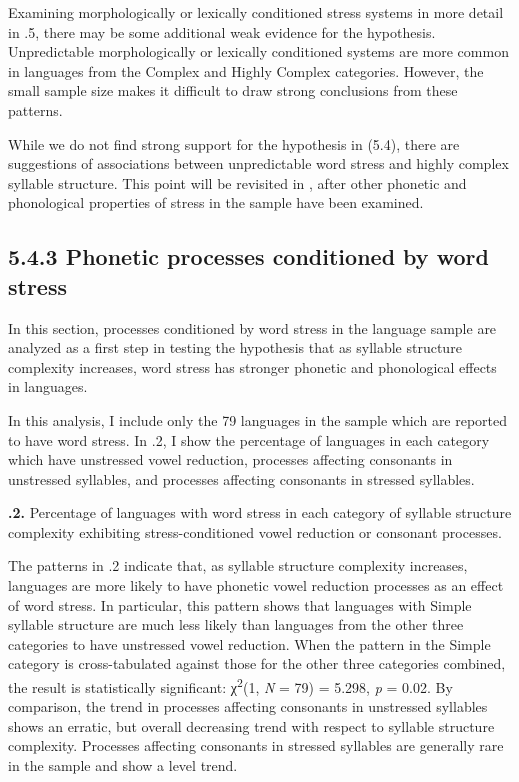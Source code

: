   Examining morphologically or lexically conditioned stress systems in more detail in .5, there may be some additional weak evidence for the hypothesis. Unpredictable morphologically or lexically conditioned systems are more common in languages from the Complex and Highly Complex categories. However, the small sample size makes it difficult to draw strong conclusions from these patterns.

  While we do not find strong support for the hypothesis in (5.4), there are suggestions of associations between unpredictable word stress and highly complex syllable structure. This point will be revisited in , after other phonetic and phonological properties of stress in the sample have been examined.

\subsection{5.4.3 Phonetic processes conditioned by word stress}

  In this section, processes conditioned by word stress in the language sample are analyzed as a first step in testing the hypothesis that as syllable structure complexity increases, word stress has stronger phonetic and phonological effects in languages.

  In this analysis, I include only the 79 languages in the sample which are reported to have word stress. In .2, I show the percentage of languages in each category which have unstressed vowel reduction, processes affecting consonants in unstressed syllables, and processes affecting consonants in stressed syllables.

\textbf{.2.} Percentage of languages with word stress in each category of syllable structure complexity exhibiting stress-conditioned vowel reduction or consonant processes.

  The patterns in .2 indicate that, as syllable structure complexity increases, languages are more likely to have phonetic vowel reduction processes as an effect of word stress. In particular, this pattern shows that languages with Simple syllable structure are much less likely than languages from the other three categories to have unstressed vowel reduction. When the pattern in the Simple category is cross-tabulated against those for the other three categories combined, the result is statistically significant: χ\textsuperscript{2}(1, \textit{N} = 79) = 5.298, \textit{p} = 0.02. By comparison, the trend in processes affecting consonants in unstressed syllables shows an erratic, but overall decreasing trend with respect to syllable structure complexity. Processes affecting consonants in stressed syllables are generally rare in the sample and show a level trend. 

